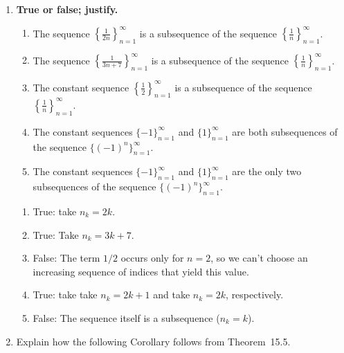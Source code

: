 \documentclass[12pt]{amsart}
\numberwithin{equation}{section}
\theoremstyle{plain} %
\theoremstyle{definition}
\theoremstyle{remark}
\begin{document}
	
\begin{enumerate} 

 \item \textbf{True or false; justify.}
\begin{enumerate} 
\item The sequence $\displaystyle \left\{ \frac{1}{2n} \right\}_{n=1}^\infty$ is a subsequence of the sequence $\displaystyle \left\{ \frac{1}{n} \right\}_{n=1}^\infty$.



\item The sequence $\displaystyle \left\{ \frac{1}{3n+7} \right\}_{n=1}^\infty$ is a subsequence of the sequence $\displaystyle \left\{ \frac{1}{n} \right\}_{n=1}^\infty$.



\item The constant sequence $\displaystyle \left\{ \frac{1}{2} \right\}_{n=1}^\infty$ is a subsequence of the sequence $\displaystyle \left\{ \frac{1}{n} \right\}_{n=1}^\infty$.



\item The constant sequences $\{ -1 \}_{n=1}^\infty$ and  $\{ 1 \}_{n=1}^\infty$ are both subsequences of the sequence $\{ (-1)^n \}_{n=1}^\infty$.



\item The constant sequences $\{ -1 \}_{n=1}^\infty$ and  $\{ 1 \}_{n=1}^\infty$ are the only two subsequences of the sequence $\{ (-1)^n \}_{n=1}^\infty$.

\end{enumerate}

\begin{framed}
\begin{enumerate} 
\item True: take $n_k=2k$.
\item True: Take $n_k = 3k+7$.
\item False: The term $1/2$ occurs only for $n=2$, so we can't choose an increasing sequence of indices that yield this value.
\item True: take take $n_k=2k+1$ and take $n_k=2k$, respectively.
\item False: The sequence itself is a subsequence ($n_k = k$).

\end{enumerate}
\end{framed}

\item Explain how the following Corollary follows from Theorem~15.5.


\end{enumerate}
\end{document}
